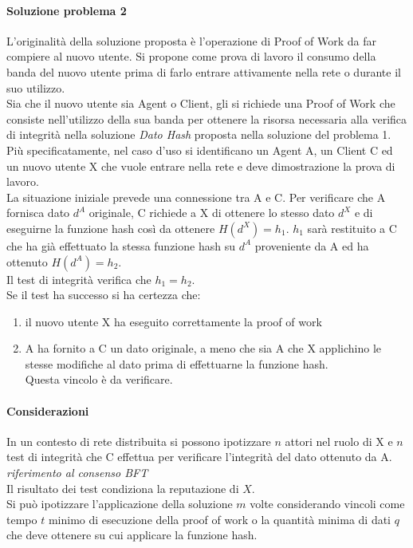 \documentclass[]{article}
\begin{document}
		\paragraph{Soluzione problema 2}
			L'originalità della soluzione proposta è l'operazione di Proof of Work da far compiere al nuovo utente. Si propone come prova di lavoro il consumo della banda del nuovo utente prima di farlo entrare attivamente nella rete o durante il suo utilizzo.\\
			Sia che il nuovo utente sia Agent o Client, gli si richiede una Proof of Work che consiste nell'utilizzo della sua banda per ottenere la risorsa necessaria alla verifica di integrità nella soluzione \textit{Dato Hash} proposta nella soluzione del problema 1.\\
			Più specificatamente, nel caso d'uso si identificano un Agent A, un Client C ed un nuovo utente X che vuole entrare nella rete e deve dimostrazione la prova di lavoro.\\
			La situazione iniziale prevede una connessione tra A e C. Per verificare che A fornisca dato $d^A$ originale, C richiede a X di ottenere lo stesso dato $d^X$ e di eseguirne la funzione hash così da ottenere  $H(d^X)=h_1$. $h_1$ sarà restituito a C che ha già effettuato la stessa funzione hash su $d^A$ proveniente da A ed ha ottenuto $H(d^A) = h_2$.\\
			Il test di integrità verifica che $h_1 = h_2$.\\
			Se il test ha successo si ha certezza che:
			\begin{enumerate}
				\item il nuovo utente X ha eseguito correttamente la proof of work 
				\item A ha fornito a C un dato originale, a meno che sia A che X applichino le stesse modifiche al dato prima di effettuarne la funzione hash.\\Questa vincolo è da verificare.
			\end{enumerate}
			
			\paragraph{Considerazioni}
			In un contesto di rete distribuita si possono ipotizzare $n$ attori nel ruolo di X e $n$ test di integrità che C effettua per verificare l'integrità del dato ottenuto da A. \textit{riferimento al consenso BFT}\\
			Il risultato dei test condiziona la reputazione di $X$.\\
			Si può ipotizzare l'applicazione della soluzione $m$ volte considerando vincoli come tempo $t$ minimo di esecuzione della proof of work o la quantità minima di dati $q$ che deve ottenere su cui applicare la funzione hash.\\
			
\end{document}

